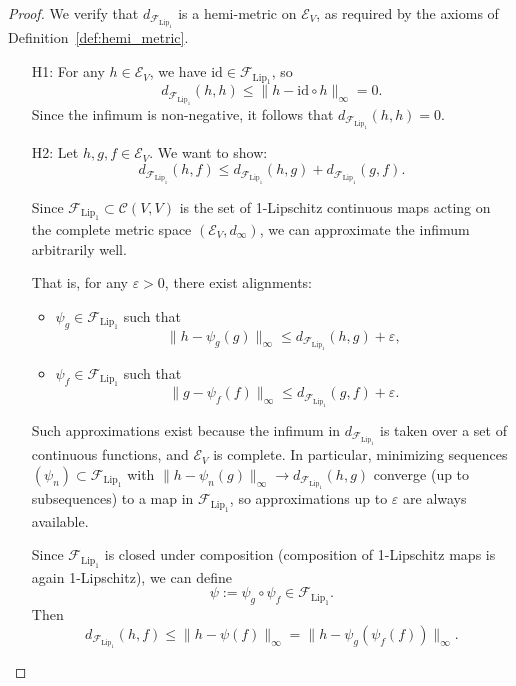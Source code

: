\begin{proof}
	We verify that \(  d_{\mathcal{F}_{\mathrm{Lip}_1}} \) is a hemi-metric on \( \mathcal{E}_V \), as required by the axioms of Definition~\ref{def:hemi_metric}.
	
	\begin{itemize}
		\item[H1:]
		For any \( h \in \mathcal{E}_V \), we have \( \mathrm{id} \in  \mathcal{F}_{\mathrm{Lip}_1} \), so
		\[
		d_{ \mathcal{F}_{\mathrm{Lip}_1}}(h, h) \leq \| h - \mathrm{id} \circ h \|_\infty = 0.
		\]
		Since the infimum is non-negative, it follows that \( 	d_{ \mathcal{F}_{\mathrm{Lip}_1}}(h, h) = 0 \).
		
		\item[H2:] Let \( h, g, f \in \mathcal{E}_V \). We want to show:
		\[
			d_{ \mathcal{F}_{\mathrm{Lip}_1}}(h,f) \leq 	d_{ \mathcal{F}_{\mathrm{Lip}_1}}(h,g) + 	d_{ \mathcal{F}_{\mathrm{Lip}_1}}(g,f).
		\]
		
		Since \( \mathcal{F}_{\text{Lip}_1} \subset \mathcal{C}(V, V) \) is the set of 1-Lipschitz continuous maps acting on the complete metric space \( (\mathcal{E}_V, d_\infty) \), we can approximate the infimum arbitrarily well.
		
		That is, for any \( \varepsilon > 0 \), there exist alignments:
		\begin{itemize}
			\item \( \psi_g \in \mathcal{F}_{\text{Lip}_1} \) such that
			\[
			\| h - \psi_g(g) \|_\infty \leq 	d_{ \mathcal{F}_{\mathrm{Lip}_1}}(h, g) + \varepsilon,
			\]
			\item \( \psi_f \in \mathcal{F}_{\text{Lip}_1} \) such that
			\[
			\| g - \psi_f(f) \|_\infty \leq 	d_{ \mathcal{F}_{\mathrm{Lip}_1}}(g, f) + \varepsilon.
			\]
		\end{itemize}
		
		Such approximations exist because the infimum in \( 	d_{ \mathcal{F}_{\mathrm{Lip}_1}} \) is taken over a set of continuous functions, and \( \mathcal{E}_V \) is complete. In particular, minimizing sequences \( (\psi_n) \subset \mathcal{F}_{\text{Lip}_1} \) with \( \| h - \psi_n(g) \|_\infty \to	d_{ \mathcal{F}_{\mathrm{Lip}_1}}(h, g) \) converge (up to subsequences) to a map in \( \mathcal{F}_{\text{Lip}_1} \), so approximations up to \( \varepsilon \) are always available.
		
		Since \( \mathcal{F}_{\text{Lip}_1} \) is closed under composition (composition of 1-Lipschitz maps is again 1-Lipschitz), we can define
		\[
		\psi := \psi_g \circ \psi_f \in \mathcal{F}_{\text{Lip}_1}.
		\]
		Then
		\[
			d_{ \mathcal{F}_{\mathrm{Lip}_1}}(h, f) \leq \| h - \psi(f) \|_\infty = \| h - \psi_g(\psi_f(f)) \|_\infty.
		\]
		

\end{itemize}
\end{proof}
